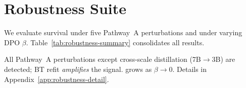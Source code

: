 \section{Robustness Suite}
\label{sec:robustness}

We evaluate \verifya{} survival under five Pathway~A perturbations
and \verifyc{} under varying DPO $\beta$.
Table~\ref{tab:robustness-summary} consolidates all results.

\begin{table}[t]
\centering
{}
\caption{Robustness summary. $\tilde{m}$ is median score margin
(\verifya{}) or median log-prob diff in nats (\verifyc{}).
Detection threshold: $p < 10^{-3}$, $\tilde{m} > 0.4$.
All Pathway~A perturbations except cross-scale distillation
(7B$\to$3B) are detected. \verifyc{} results are under
synthetic-$\sigmastyle$ DPO only (\S\ref{sec:experiments:verifyc}).
Detailed per-perturbation analysis in
Appendix~\ref{app:robustness-detail}.}
\label{tab:robustness-summary}
\end{table}

All Pathway~A perturbations except cross-scale distillation
(7B$\to$3B) are detected; BT refit \emph{amplifies} the signal.
\verifyc{} grows as $\beta \to 0$. Details in
Appendix~\ref{app:robustness-detail}.

